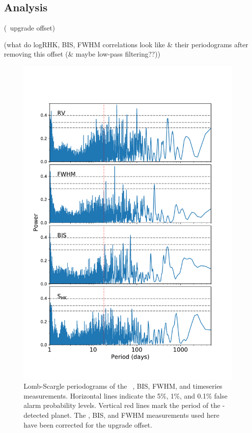 \documentclass[modern]{aastex62}
\begin{document}
\subsection{\RV Analysis}
\label{s:analysis:rvs}

(\HARPS\ upgrade offset)

(what do logRHK, BIS, FWHM correlations look like \& their periodograms after removing this offset (\& maybe low-pass filtering??))

\begin{figure}
    \centering
    \includegraphics[width=\textwidth]{periodograms.pdf}
    \caption{Lomb-Scargle periodograms of the \HARPS\ \RV, BIS, FWHM, and \shk timeseries measurements. Horizontal lines indicate the 5\%, 1\%, and 0.1\% false alarm probability levels. Vertical red lines mark the period of the \TESS-detected planet. The \RV, BIS, and FWHM measurements used here have been corrected for the \HARPS upgrade offset.}
    \label{fig:periodograms}
\end{figure}
\end{document}
